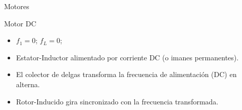 \documentclass[xcolor={usenames,svgnames,dvipsnames}]{beamer}
\begin{document}
\begin{frame}[label={sec:org3d08cc0}]{Motores}
\begin{block}{Motor DC}
\begin{itemize}
\item \(f_{1}=0\); \(f_{L}=0\);

\item Estator-Inductor alimentado por corriente DC (o imanes permanentes).

\item El colector de delgas transforma la frecuencia de alimentación (DC)
en alterna.

\item Rotor-Inducido gira sincronizado con la frecuencia \guillemotleft{}transformada\guillemotright{}.
\end{itemize}
\end{block}
\end{frame}
\end{document}
